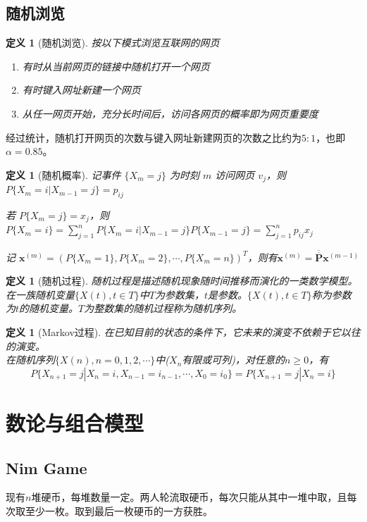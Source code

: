 \documentclass[10t, a4paper, oneside]{ctexbook}
\newtheorem{definition}[theorem]{定义}
\begin{document}
\section{随机浏览}
\begin{definition}[随机浏览]
    按以下模式浏览互联网的网页
\begin{enumerate}
    \item 有时从当前网页的链接中随机打开一个网页
    \item 有时键入网址新建一个网页
    \item 从任一网页开始，充分长时间后，访问各网页的概率即为网页重要度
\end{enumerate}
\end{definition}
经过统计，随机打开网页的次数与键入网址新建网页的次数之比约为$5:1$，也即$\alpha=0.85$。

\begin{definition}[随机概率]
记事件 $\{X_m=j\}$ 为时刻 $m$ 访问网页 $v_j$，则$P\{X_m=i | X_{m-1}=j\}=p_{ij}$

若  $P\{X_m=j\}=x_j$，则$P\{X_{m}=i\}=\sum\limits_{j=1}^nP\{X_m=i | X_{m-1}=j\}P\{X_{m-1}=j\}=\sum\limits_{j=1}^np_{ij}x_j$

记 $\mathbf{x}^{(m)}=(P\{X_m=1\},P\{X_m=2\},\cdots,P\{X_m=n\})^T$，则有$\mathbf{x}^{(m)}=\overline{\overline{\mathbf{P}}}\mathbf{x}^{(m-1)}$
\end{definition}
\begin{definition}[随机过程]
随机过程是描述随机现象随时间推移而演化的一类数学模型。\\
在一族随机变量$\{X(t),t\in T\}$中$T$为参数集，$t$是参数。$\{X(t),t\in T\}$称为参数为$t$的随机变量。$T$为整数集的随机过程称为随机序列。
\end{definition}
\begin{definition}[Markov过程]
在已知目前的状态的条件下，它未来的演变不依赖于它以往的演变。\\
在随机序列$\{X(n),n=0,1,2,\cdots\}$中($X_n$有限或可列)，对任意的$n\geq0$，有
$$P\{X_{n+1}=j | X_n=i,X_{n-1}=i_{n-1},\cdots,X_0=i_0\}=P\{X_{n+1}=j | X_n=i\}$$
\end{definition}
\newpage
\chapter{数论与组合模型}
\section{Nim Game}
现有$n$堆硬币，每堆数量一定。两人轮流取硬币，每次只能从其中一堆中取，且每次取至少一枚。取到最后一枚硬币的一方获胜。 
\end{document}
